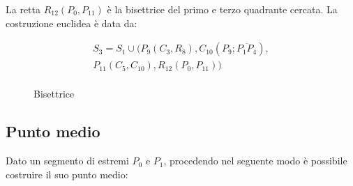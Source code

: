 \noindent
La retta $R_{12}(P_{0}, P_{11} )$ è la bisettrice del primo e terzo quadrante cercata. La costruzione euclidea è data da:

\begin{align*}
S_{3} = S_{1} \cup (P_{9}(C_{3}, R_{8}), C_{10}(P_{9}; \overline{P_{1}P_{4}} ),  \\
 P_{11}(C_{5}, C_{10}),  R_{12}(P_{0}, P_{11} ) ) \\
\end{align*}


\begin{figure}[!h]
\begin{center}
\caption{Bisettrice}
\end{center}
\end{figure}

\subsection{Punto medio} \label{medio}
Dato un segmento di estremi $P_{0}$ e $P_{1}$, procedendo nel seguente modo è possibile costruire il suo punto medio:

